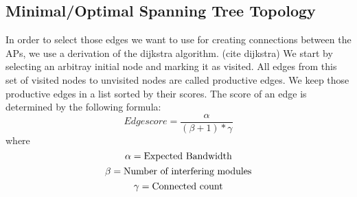   \subsection{Minimal/Optimal Spanning Tree Topology}
  In order to select those edges we want to use for creating connections between the APs, we use a derivation of the dijkstra algorithm. (cite dijkstra)
  We start by selecting an arbitray initial node and marking it as visited. All edges from this set of visited nodes to unvisited nodes are called productive edges.
  We keep those productive edges in a list sorted by their scores. The score of an edge is determined by the following formula:
  $$Edgescore=\frac{\alpha}{(\beta + 1 )* \gamma}$$
  where $$\alpha = \text{Expected Bandwidth}\newline$$
  $$\beta = \text{Number of interfering modules}\newline$$
  $$\gamma = \text{Connected count}\newline$$
